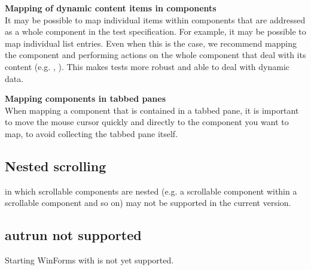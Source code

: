\textbf{Mapping of dynamic content items in components}\\
It may be possible to map individual items within components that are addressed as a whole component in the test specification. For example, it may be possible to map individual list entries. Even when this is the case, we recommend mapping the  component and performing actions on the whole component that deal with its content (e.g. , ). This makes tests more robust and able to deal with dynamic data. 

\textbf{Mapping components in tabbed panes}\\
When mapping a component that is contained in a tabbed pane,  it is important to move the mouse cursor quickly and directly to the component you want to map, to avoid collecting the tabbed pane itself. 

\subsection{Nested scrolling}
\gdauts{} in which scrollable components are nested (e.g. a scrollable component within a scrollable component and so on) may not be supported in the current version. 

\subsection{autrun not supported}
Starting WinForms \gdauts{} with  is not yet supported. 
